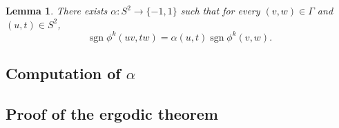 \documentclass[reqno,12pt,letterpaper]{amsart}
\newtheorem{lemma}[theorem]{Lemma}
\theoremstyle{definition}
\DeclareMathOperator{\sgn}{sgn}
\begin{document}
\begin{lemma}
There exists \(\alpha: S^2 \to \{-1, 1\}\) such that for every \((v, w) \in \Gamma\) and \((u, t) \in S^2\),
$$\sgn \phi^k(uv, tw) = \alpha(u, t) \sgn \phi^k(v, w).$$
\end{lemma}




\subsection{Computation of \(\alpha\)}
\label{sec:orgffd9c44}

\subsection{Proof of the ergodic theorem}
\label{sec:org2558108}
\end{document}
